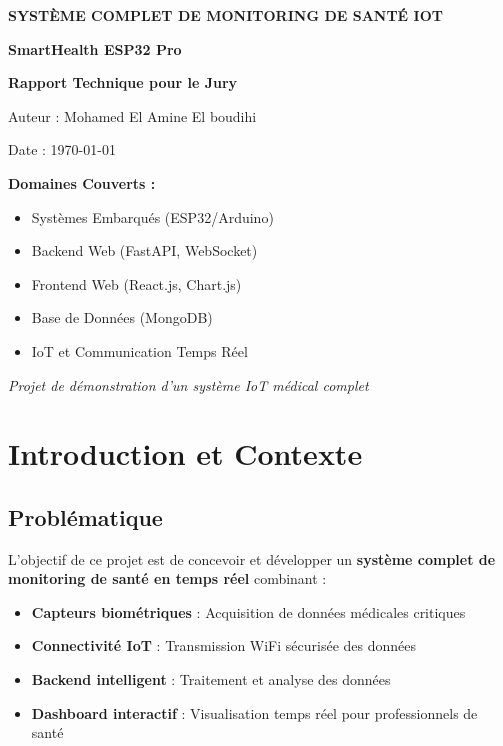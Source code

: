 \documentclass[12pt,french]{report}
\begin{document}
\begin{titlepage}
    \centering
    \vspace*{2cm}
    
    {\Large \textbf{SYSTÈME COMPLET DE MONITORING DE SANTÉ IOT}}
    
    \vspace{0.5cm}
    {\LARGE \textbf{\color{darkblue}SmartHealth ESP32 Pro}}
    
    \vspace{2cm}
    {\large \textbf{Rapport Technique pour le Jury}}
    
    \vspace{1cm}
    {\large Auteur : Mohamed El Amine El boudihi}
    
    \vspace{1cm}
    {\large Date : \today}
    
    \vspace{2cm}
    {\large \textbf{Domaines Couverts :}}
    \begin{itemize}
        \item Systèmes Embarqués (ESP32/Arduino)
        \item Backend Web (FastAPI, WebSocket)
        \item Frontend Web (React.js, Chart.js)
        \item Base de Données (MongoDB)
        \item IoT et Communication Temps Réel
    \end{itemize}
    
    \vfill
    \textit{Projet de démonstration d'un système IoT médical complet}
\end{titlepage}

\tableofcontents
\newpage

\chapter{Introduction et Contexte}

\section{Problématique}

L'objectif de ce projet est de concevoir et développer un \textbf{système complet de monitoring de santé en temps réel} combinant :

\begin{itemize}
    \item \textbf{Capteurs biométriques} : Acquisition de données médicales critiques
    \item \textbf{Connectivité IoT} : Transmission WiFi sécurisée des données
    \item \textbf{Backend intelligent} : Traitement et analyse des données
    \item \textbf{Dashboard interactif} : Visualisation temps réel pour professionnels de santé
\end{itemize}
\end{document}
